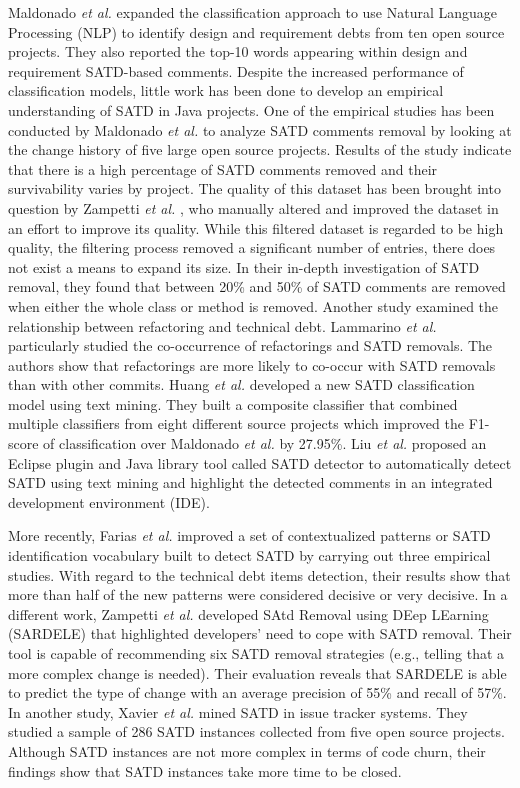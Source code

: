 \documentclass[3p]{elsarticle}
\begin{document}
Maldonado \textit{et al.} \cite{Maldonado2017-1} expanded the classification approach to use Natural Language Processing (NLP) to identify design and requirement debts from ten open source projects. They also reported the top-10 words appearing within design and requirement SATD-based comments.  Despite the increased performance of classification models, little work has been done to develop an empirical understanding of SATD in Java projects. One of the empirical studies has been conducted by Maldonado \textit{et al.} \cite{Maldonado2017-2} to analyze SATD comments removal by looking at the change history of five large open source projects.  Results of the study indicate that there is a high percentage of SATD comments removed and their survivability varies by project. The quality of this dataset has been brought into question by Zampetti \textit{et al.} \cite{Zampetti}, who manually altered and improved the dataset in an effort to improve its quality. While this filtered dataset is regarded to be high quality, the filtering process removed a significant number of entries, there does not exist a means to expand its size. In their in-depth investigation of SATD removal, they found that between 20\% and 50\% of SATD comments are removed when either the whole class or method is removed. Another study examined the relationship between refactoring and technical debt. Lammarino \textit{et al.} \cite{iammarino2019self}  particularly studied the co-occurrence of refactorings and SATD removals. The authors show that refactorings are more likely to co-occur with SATD removals than with other commits. Huang \textit{et al.} \cite{Huang} developed a new SATD classification model using text mining. They built a composite classifier that combined multiple classifiers from eight different source projects which improved the F1-score of classification over Maldonado \textit{et al.} by 27.95\%. Liu \textit{et al.} \cite{liu2018satd} proposed an Eclipse plugin and Java library tool called SATD detector to automatically detect SATD using text mining and highlight the detected comments in an integrated development environment (IDE).

More recently, Farias \textit{et al.} \cite{de2020identifying} improved a set of contextualized patterns or SATD identification vocabulary built to detect SATD by carrying out three empirical studies. With regard to the technical debt items detection, their results show that more than half of the new patterns were considered decisive or very decisive. In a different work, Zampetti \textit{et al.} \cite{zampetti2020automatically} developed SAtd Removal using DEep LEarning (SARDELE) that highlighted developers' need to cope with SATD removal.  Their tool is capable of recommending six SATD removal strategies (e.g., telling that a more complex change is needed). Their evaluation reveals that SARDELE is able to predict the type of change with an average precision of 55\% and recall of 57\%. In another study, Xavier \textit{et al.} \cite{xavier2020beyond} mined SATD in issue tracker systems.
They studied a sample of 286 SATD instances collected from five open source projects. Although  SATD instances are not more complex in terms of code churn, their findings show that SATD instances take more time to be closed.
\end{document}
